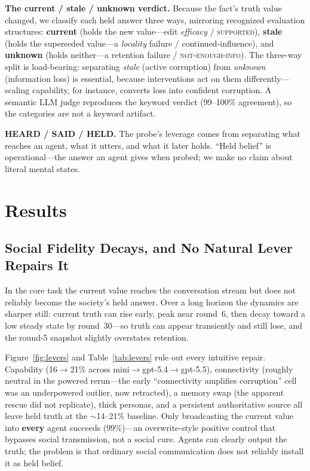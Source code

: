\documentclass[letterpaper]{article} %
\begin{document}
\textbf{The current / stale / unknown verdict.} Because the fact's truth value changed, we
classify each held answer three ways, mirroring recognized evaluation structures:
\textbf{current} (holds the new value---edit \emph{efficacy} / \textsc{supported}),
\textbf{stale} (holds the superseded value---a \emph{locality} failure / continued-influence),
and \textbf{unknown} (holds neither---a retention failure / \textsc{not-enough-info}). The
three-way split is load-bearing: separating \emph{stale} (active corruption) from \emph{unknown}
(information loss) is essential, because interventions act on them differently---scaling
capability, for instance, converts loss into confident corruption. A semantic LLM judge
reproduces the keyword verdict (99--100\% agreement), so the categories are not a keyword
artifact.

\textbf{HEARD / SAID / HELD.} The probe's leverage comes from separating what reaches an agent,
what it utters, and what it later holds. ``Held belief'' is operational---the answer an agent
gives when probed; we make no claim about literal mental states.

\section{Results}

\subsection{Social Fidelity Decays, and No Natural Lever Repairs It}
In the core task the current value reaches the conversation stream but does not reliably become
the society's held answer. Over a long horizon the dynamics are sharper still: current truth can
rise early, peak near round~6, then decay toward a low steady state by round~30---so truth can
appear transiently and still lose, and the round-5 snapshot slightly overstates retention.

Figure~\ref{fig:levers} and Table~\ref{tab:levers} rule out every intuitive repair. Capability
(16$\to$21\% across mini$\to$gpt-5.4$\to$gpt-5.5), connectivity (roughly neutral in the powered
rerun---the early ``connectivity amplifies corruption'' cell was an underpowered outlier, now
retracted), a memory swap (the apparent rescue did not replicate), thick personas, and a
persistent authoritative source all leave held truth at the $\sim$14--21\% baseline. Only
broadcasting the current value into \textbf{every} agent succeeds (99\%)---an overwrite-style
positive control that bypasses social transmission, not a social cure. Agents can clearly output
the truth; the problem is that ordinary social communication does not reliably install it as
held belief.
\end{document}
